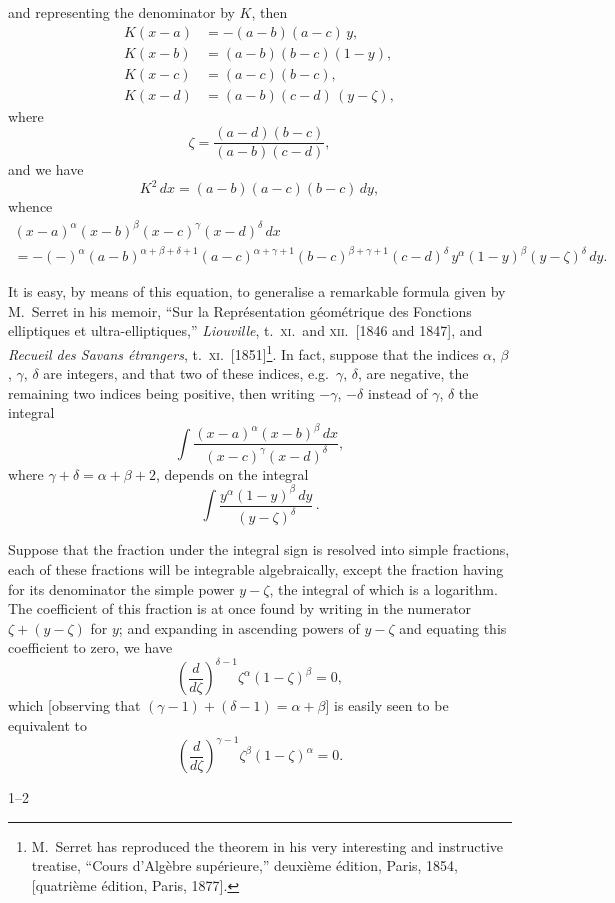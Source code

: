 \documentclass[11pt]{article}
\begin{document}
\noindent and representing the denominator by $K$, then
\begin{align*}
K(x-a) &= -(a-b)(a-c)\, y,\\
K(x-b) &= (a-b)(b-c)(1-y),\\
K(x-c) &= (a-c)(b-c),\\
K(x-d) &= (a-b)(c-d)\,(y-\zeta),
\end{align*}
where
\[
\zeta = \frac{(a-d)(b-c)}{(a-b)(c-d)},
\]
and we have
\[
K^{2}\, dx = (a-b)(a-c)(b-c)\, dy,
\]
whence
\begin{multline*}
(x-a)^{\alpha}(x-b)^{\beta}(x-c)^{\gamma}(x-d)^{\delta}\, dx\\
= -(-)^{\alpha}(a-b)^{\alpha+\beta+\delta+1}(a-c)^{\alpha+\gamma+1}(b-c)^{\beta+\gamma+1}(c-d)^{\delta}\, y^{\alpha}(1-y)^{\beta}(y-\zeta)^{\delta}\, dy.
\end{multline*}

It is easy, by means of this equation, to generalise a remarkable formula given by
M.~Serret in his memoir, ``Sur la Repr\'esentation g\'eom\'etrique des Fonctions elliptiques
et ultra-elliptiques,'' \textit{Liouville}, t.~\textsc{xi}.\ and \textsc{xii}.\ [1846 and 1847], and \textit{Recueil des Savans
\'etrangers}, t.~\textsc{xi}.\ [1851]\footnote{M.~Serret has reproduced the theorem in his very interesting and instructive treatise, ``Cours d'Alg\`ebre
sup\'erieure,'' deuxi\`eme \'edition, Paris, 1854, [quatri\`eme \'edition, Paris, 1877].}. In fact, suppose that the indices $\alpha$, $\beta$, $\gamma$, $\delta$ are integers, and
that two of these indices, e.g.\ $\gamma$, $\delta$, are negative, the remaining two indices being
positive, then writing $-\gamma$, $-\delta$ instead of $\gamma$, $\delta$ the integral
\[
\int \frac{(x-a)^{\alpha}(x-b)^{\beta}\, dx}{(x-c)^{\gamma}(x-d)^{\delta}},
\]
where $\gamma+\delta = \alpha+\beta+2$, depends on the integral
\[
\int \frac{y^{\alpha}(1-y)^{\beta}\, dy}{(y-\zeta)^{\delta}}\,.
\]

Suppose that the fraction under the integral sign is resolved into simple fractions, each
of these fractions will be integrable algebraically, except the fraction having for its
denominator the simple power $y-\zeta$, the integral of which is a logarithm. The
coefficient of this fraction is at once found by writing in the numerator $\zeta+(y-\zeta)$
for $y$; and expanding in ascending powers of $y-\zeta$ and equating this coefficient to
zero, we have
\[
\left(\frac{d}{d\zeta}\right)^{\delta-1}\zeta^{\alpha}(1-\zeta)^{\beta} = 0,
\]
which [observing that $(\gamma-1)+(\delta-1) = \alpha+\beta$] is easily seen to be equivalent to
\[
\left(\frac{d}{d\zeta}\right)^{\gamma-1}\zeta^{\beta}(1-\zeta)^{\alpha} = 0.
\]

\vspace{1em}
\noindent\hfill 1--2
\end{document}
